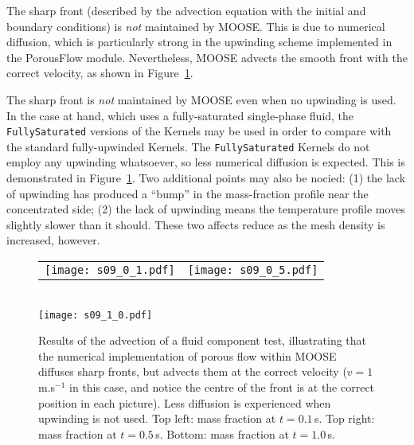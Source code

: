 \documentclass[]{scrreprt}
\begin{document}
The sharp front (described by the advection equation
with the initial and boundary conditions) is {\em not} maintained by
MOOSE.  This is due to numerical diffusion, which is particularly
strong in the upwinding scheme implemented in the PorousFlow module.
Nevertheless, MOOSE advects the smooth front with the correct
velocity, as shown in Figure~\ref{s09.fig}.

The sharp front is {\em not} maintained by MOOSE even when no
upwinding is used.  In the case at hand, which uses a fully-saturated
single-phase fluid, the {\tt FullySaturated} versions of the Kernels
may be used in order to compare with the standard fully-upwinded
Kernels.  The {\tt FullySaturated} Kernels do not employ any upwinding
whatsoever, so less numerical
diffusion is expected.  This is demonstrated in
Figure~\ref{s09.fig}.  Two additional points may also be
nocied: (1) the lack of upwinding has produced a ``bump'' in the
mass-fraction profile near the concentrated side; (2) the lack of upwinding
means the temperature profile moves slightly slower than it should.
These two affects reduce as the mesh density is increased, however.

\begin{figure}[htb]
\begin{center}
\begin{tabular}{cc}
\texttt{[image: s09\_0\_1.pdf]}  &
\texttt{[image: s09\_0\_5.pdf]}
\end{tabular} \\
\texttt{[image: s09\_1\_0.pdf]}
\caption{Results of the advection of a fluid component test,
  illustrating that the numerical implementation of porous flow within
  MOOSE diffuses sharp fronts, but advects them at the correct
  velocity ($v=1$\,m.s$^{-1}$ in this case, and notice the centre of
  the front is at the correct position in each picture).  Less
  diffusion is experienced when upwinding is not used.  Top left: mass
  fraction at $t=0.1$\,s.  Top right: mass fraction at $t=0.5$\,s.
  Bottom: mass fraction at $t=1.0$\,s.}
\label{s09.fig}
\end{center}
\end{figure}
\end{document}
